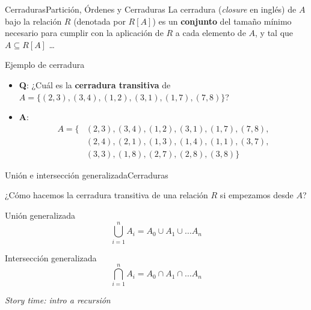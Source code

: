 \documentclass[spanish, c]{beamer}
\begin{document}
\begin{frame}{Cerraduras}{Partición, Órdenes y Cerraduras}
    La \alert{cerradura} (\textit{closure} en inglés) de $A$ bajo la relación $R$ (denotada por $R[A]$) es un \textbf{conjunto} del tamaño mínimo necesario para cumplir con la aplicación de $R$ a cada elemento de $A$, y tal que $A \subseteq R[A]$ \dots

    \pause

    \bigskip

    \begin{exampleblock}{Ejemplo de cerradura}
        \begin{itemize}
            \item \textbf{Q}: ¿Cuál es la \textbf{cerradura transitiva} de $A = \{(2, 3), (3, 4), (1, 2), (3, 1), (1,7),(7,8)\}$?
            \item \textbf{A}: \begin{align*}
                A = \{& (2, 3), (3, 4), (1, 2), (3, 1), (1, 7), (7, 8), \\
                      & (2, 4), (2, 1), (1, 3), (1, 4), (1, 1), (3, 7), \\
                      & (3, 3), (1, 8), (2, 7), (2, 8), (3, 8) \}
            \end{align*}
        \end{itemize}        
    \end{exampleblock}

\end{frame}

\begin{frame}{Unión e intersección generalizada}{Cerraduras}

    ¿Cómo hacemos la cerradura transitiva de una relación $R$ si empezamos desde $A$? \pause

    \begin{block}{Unión generalizada}
        $$\bigcup_{i=1}^n A_i = A_0 \cup A_1 \cup \dots A_n$$
    \end{block} \pause

    \bigskip

    \begin{block}{Intersección generalizada}
        $$\bigcap_{i=1}^n A_i = A_0 \cap A_1 \cap \dots A_n$$
    \end{block}

    \bigskip

    \begin{center}
        \textit{Story time: intro a recursión}
    \end{center}

\end{frame}
\end{document}
